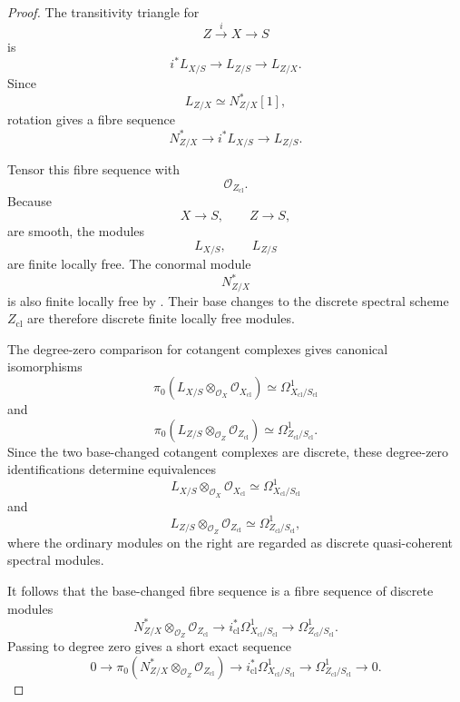 \begin{proof}
The transitivity triangle for
\[
    Z
    \xrightarrow{i}
    X
    \longrightarrow
    S
\]
is
\[
    i^*L_{X/S}
    \longrightarrow
    L_{Z/S}
    \longrightarrow
    L_{Z/X}.
\]
Since
\[
    L_{Z/X}
    \simeq
    N^*_{Z/X}[1],
\]
rotation gives a fibre sequence
\[
    N^*_{Z/X}
    \longrightarrow
    i^*L_{X/S}
    \longrightarrow
    L_{Z/S}.
\]

Tensor this fibre sequence with
\[
    \mathcal O_{Z_{\mathrm{cl}}}.
\]
Because
\[
    X\longrightarrow S,
    \qquad
    Z\longrightarrow S,
\]
are smooth, the modules
\[
    L_{X/S},
    \qquad
    L_{Z/S}
\]
are finite locally free.  The conormal module
\[
    N^*_{Z/X}
\]
is also finite locally free by
.  Their base changes to the
discrete spectral scheme \(Z_{\mathrm{cl}}\) are therefore discrete
finite locally free modules.

The degree-zero comparison for cotangent complexes gives canonical
isomorphisms
\[
    \pi_0
    \left(
        L_{X/S}
        \otimes_{\mathcal O_X}
        \mathcal O_{X_{\mathrm{cl}}}
    \right)
    \simeq
    \Omega^1_{X_{\mathrm{cl}}/S_{\mathrm{cl}}}
\]
and
\[
    \pi_0
    \left(
        L_{Z/S}
        \otimes_{\mathcal O_Z}
        \mathcal O_{Z_{\mathrm{cl}}}
    \right)
    \simeq
    \Omega^1_{Z_{\mathrm{cl}}/S_{\mathrm{cl}}}.
\]
Since the two base-changed cotangent complexes are discrete, these
degree-zero identifications determine equivalences
\[
    L_{X/S}
    \otimes_{\mathcal O_X}
    \mathcal O_{X_{\mathrm{cl}}}
    \simeq
    \Omega^1_{X_{\mathrm{cl}}/S_{\mathrm{cl}}}
\]
and
\[
    L_{Z/S}
    \otimes_{\mathcal O_Z}
    \mathcal O_{Z_{\mathrm{cl}}}
    \simeq
    \Omega^1_{Z_{\mathrm{cl}}/S_{\mathrm{cl}}},
\]
where the ordinary modules on the right are regarded as discrete
quasi-coherent spectral modules.

It follows that the base-changed fibre sequence is a fibre sequence of
discrete modules
\[
    N^*_{Z/X}
    \otimes_{\mathcal O_Z}
    \mathcal O_{Z_{\mathrm{cl}}}
    \longrightarrow
    i_{\mathrm{cl}}^*
    \Omega^1_{X_{\mathrm{cl}}/S_{\mathrm{cl}}}
    \longrightarrow
    \Omega^1_{Z_{\mathrm{cl}}/S_{\mathrm{cl}}}.
\]
Passing to degree zero gives a short exact sequence
\[
    0
    \longrightarrow
    \pi_0
    \left(
        N^*_{Z/X}
        \otimes_{\mathcal O_Z}
        \mathcal O_{Z_{\mathrm{cl}}}
    \right)
    \longrightarrow
    i_{\mathrm{cl}}^*
    \Omega^1_{X_{\mathrm{cl}}/S_{\mathrm{cl}}}
    \longrightarrow
    \Omega^1_{Z_{\mathrm{cl}}/S_{\mathrm{cl}}}
    \longrightarrow
    0.
\]


\end{proof}
